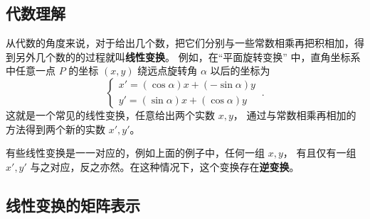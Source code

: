 

\begin{issues}
\issueDraft
{}
\end{issues}


\subsection{代数理解}
从代数的角度来说，对于给出几个数，把它们分别与一些常数相乘再把积相加，得到另外几个数的的过程就叫\textbf{线性变换}。 例如，在“平面旋转变换” 中，直角坐标系中任意一点 $P$ 的坐标 $(x,y)$ 绕远点旋转角 $\alpha $ 以后的坐标为
\begin{equation}\label{eq_LTrans_1}
\begin{cases}
x' = (\cos\alpha) x + (-\sin\alpha)y\\
y' = (\sin \alpha)x + (\cos\alpha)y
\end{cases}~.
\end{equation}
这就是一个常见的线性变换，任意给出两个实数 $x,y$， 通过与常数相乘再相加的方法得到两个新的实数  $x',y'$。 

有些线性变换是一一对应的，例如上面的例子中，任何一组 $x,y$， 有且仅有一组 $x',y'$ 与之对应，反之亦然。在这种情况下，这个变换存在\textbf{逆变换}。

\subsection{线性变换的矩阵表示}


